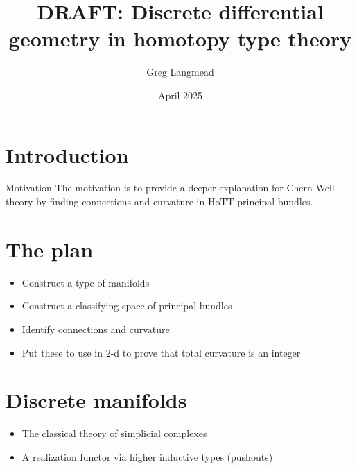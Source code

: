 \documentclass[14pt,aspectratio=169,compress]{beamer}
\title[Geometry in HoTT]{DRAFT: Discrete differential geometry in homotopy type theory}
\author{Greg Langmead}
\institute[CMU]{Carnegie Mellon University}
\date{April 2025}
\begin{document}
\begin{frame}
\titlepage
\end{frame}

\begin{frame}
\tableofcontents
\end{frame}


\section{Introduction}

\begin{frame}{Motivation}
The motivation is to provide \alert{a deeper explanation} for \alert{Chern-Weil theory} by finding \alert{connections} and \alert{curvature} in HoTT \alert{principal bundles}.
\end{frame}


\section{The plan}
\begin{frame}
\begin{itemize}
\item Construct a type of manifolds
\item Construct a classifying space of principal bundles
\item Identify connections and curvature
\item Put these to use in 2-d to prove that total curvature is an integer
\end{itemize}
\end{frame}

\section{Discrete manifolds}

\begin{frame}
\begin{itemize}
\item The classical theory of \alert{simplicial complexes}
\item A \alert{realization} functor via higher inductive types (pushouts)
\end{itemize}
\end{frame}
\end{document}
